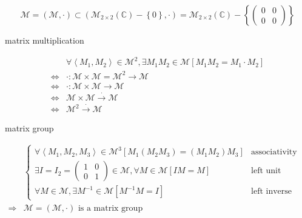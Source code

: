 \documentclass[
]{book}
\theoremstyle{definition}
\theoremstyle{definition}
\theoremstyle{definition}
\theoremstyle{definition}
\theoremstyle{remark}
\begin{document}
\[
\mathcal{M}=\left(\mathcal{M},\cdot\right)\subset\left(\mathcal{M}_{2\times2}\left(\mathbb{C}\right)-\left\{ 0\right\} ,\cdot\right)=\mathcal{M}_{2\times2}\left(\mathbb{C}\right)-\left\{ \begin{pmatrix}0 & 0\\
0 & 0
\end{pmatrix}\right\} 
\]

matrix multiplication

\[
\begin{aligned}
 & \forall\left\langle M_{{\scriptscriptstyle 1}},M_{{\scriptscriptstyle 2}}\right\rangle \in\mathcal{M}^{2},\exists M_{{\scriptscriptstyle 1}}M_{{\scriptscriptstyle 2}}\in\mathcal{M}\left[M_{{\scriptscriptstyle 1}}M_{{\scriptscriptstyle 2}}=M_{{\scriptscriptstyle 1}}\cdot M_{{\scriptscriptstyle 2}}\right]\\
\Leftrightarrow & \cdot:\mathcal{M}\times\mathcal{M}=\mathcal{M}^{2}\rightarrow\mathcal{M}\\
\Leftrightarrow & \cdot:\mathcal{M}\times\mathcal{M}\rightarrow\mathcal{M}\\
\Leftrightarrow & \mathcal{M}\times\mathcal{M}\overset{\cdot}{\rightarrow}\mathcal{M}\\
\Leftrightarrow & \mathcal{M}^{2}\overset{\cdot}{\rightarrow}\mathcal{M}
\end{aligned}
\]

matrix group

\[
\begin{aligned}
 & \begin{cases}
\forall\left\langle M_{{\scriptscriptstyle 1}},M_{{\scriptscriptstyle 2}},M_{{\scriptscriptstyle 3}}\right\rangle \in\mathcal{M}^{3}\left[M_{{\scriptscriptstyle 1}}\left(M_{{\scriptscriptstyle 2}}M_{{\scriptscriptstyle 3}}\right)=\left(M_{{\scriptscriptstyle 1}}M_{{\scriptscriptstyle 2}}\right)M_{{\scriptscriptstyle 3}}\right] & \text{associativity}\\
\exists I=I_{2}=\begin{pmatrix}1 & 0\\
0 & 1
\end{pmatrix}\in\mathcal{M},\forall M\in\mathcal{M}\left[IM=M\right] & \text{left unit element}\\
\forall M\in\mathcal{M},\exists M^{-1}\in\mathcal{M}\left[M^{-1}M=I\right] & \text{left inverse (element)}
\end{cases}\\
\Rightarrow & \mathcal{M}=\left(\mathcal{M},\cdot\right)\text{ is a matrix group}
\end{aligned}
\]
\end{document}
